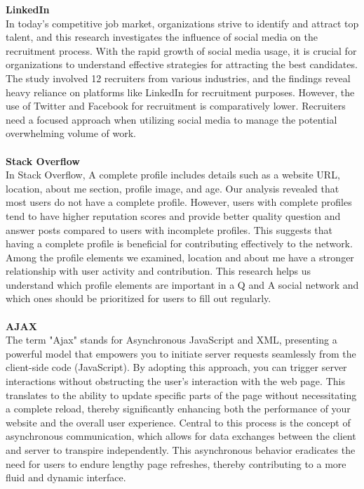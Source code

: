 \textbf{LinkedIn}\\
In today's competitive job market, organizations strive to identify and attract top talent, and this research investigates the influence of social media on the recruitment process. With the rapid growth of social media usage, it is crucial for organizations to understand effective strategies for attracting the best candidates. The study involved 12 recruiters from various industries, and the findings reveal heavy reliance on platforms like LinkedIn for recruitment purposes. However, the use of Twitter and Facebook for recruitment is comparatively lower. Recruiters need a focused approach when utilizing social media to manage the potential overwhelming volume of work. \cite{koch2018impact}\\\\

\textbf{Stack Overflow}\\
In Stack Overflow, A complete profile includes details such as a website URL, location, about me section, profile image, and age. Our analysis revealed that most users do not have a complete profile. However, users with complete profiles tend to have higher reputation scores and provide better quality question and answer posts compared to users with incomplete profiles. This suggests that having a complete profile is beneficial for contributing effectively to the network. Among the profile elements we examined, location and about me have a stronger relationship with user activity and contribution. This research helps us understand which profile elements are important in a Q and A social network and which ones should be prioritized for users to fill out regularly.\cite{adaji2016towards}\\\\

\textbf{AJAX}\\
The term "Ajax" stands for Asynchronous JavaScript and XML, presenting a powerful model that empowers you to initiate server requests seamlessly from the client-side code (JavaScript). By adopting this approach, you can trigger server interactions without obstructing the user's interaction with the web page. This translates to the ability to update specific parts of the page without necessitating a complete reload, thereby significantly enhancing both the performance of your website and the overall user experience. Central to this process is the concept of asynchronous communication, which allows for data exchanges between the client and server to transpire independently. This asynchronous behavior eradicates the need for users to endure lengthy page refreshes, thereby contributing to a more fluid and dynamic interface. \cite{paz2013ajax}

